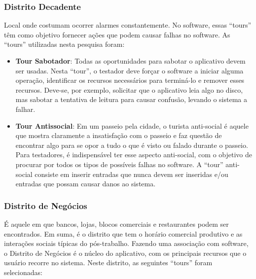 \subsubsection{Distrito Decadente} 

Local onde costumam ocorrer alarmes constantemente. No software, essas ``tours'' têm como objetivo fornecer ações que podem causar falhas no software. As ``tours'' utilizadas nesta pesquisa foram:

\begin {itemize}
    \item \textbf {Tour Sabotador}: Todas as oportunidades para sabotar o aplicativo devem ser usadas. Nesta ``tour'', o testador deve forçar o software a iniciar alguma operação, identificar os recursos necessários para terminá-lo e remover esses recursos. Deve-se, por exemplo, solicitar que o aplicativo leia algo no disco, mas sabotar a tentativa de leitura para causar confusão, levando o sistema a falhar.
    \item \textbf {Tour Antissocial}: Em um passeio pela cidade, o turista anti-social é aquele que mostra claramente a insatisfação com o passeio e faz questão de encontrar algo para se opor a tudo o que é visto ou falado durante o passeio. Para testadores, é indispensável ter esse aspecto anti-social, com o objetivo de procurar por todos os tipos de possíveis falhas no software. A ``tour'' anti-social consiste em inserir entradas que nunca devem ser inseridas e/ou entradas que possam causar danos ao sistema.
\end {itemize}

\subsubsection{Distrito de Negócios}

É aquele em que bancos, lojas, blocos comerciais e restaurantes podem ser encontrados. Em suma, é o distrito que tem o horário comercial produtivo e as interações sociais típicas do pós-trabalho. Fazendo uma associação com software, o Distrito de Negócios é o núcleo do aplicativo, com os principais recursos que o usuário recorre no sistema. Neste distrito, as seguintes ``tours'' foram selecionadas:

